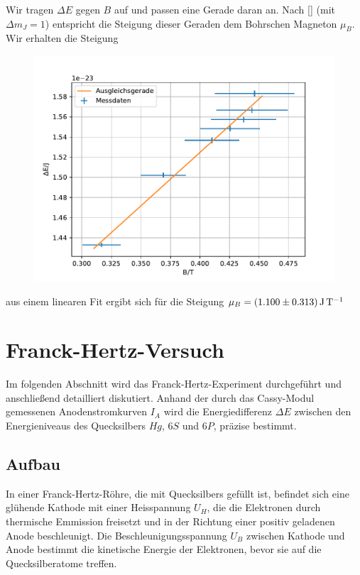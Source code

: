 \documentclass{article}
\begin{document}
\begin{multicols}{2}
Wir tragen $\Delta E$ gegen $B$ auf und passen eine Gerade daran an. Nach \eqref{} (mit $\Delta m_J=1$)
entspricht die Steigung dieser Geraden dem Bohrschen Magneton $\mu_B$. Wir erhalten die Steigung



\begin{figure}[H]
  \centering
  \includegraphics[width=\linewidth]{energy_plot.pdf}
\end{figure}
aus einem linearen Fit ergibt sich für die Steigung
$\mu_B = \SI{1.1\pm 0.313}{\J\per\T}$



\clearpage
\section{Franck-Hertz-Versuch}
Im folgenden Abschnitt wird das Franck-Hertz-Experiment durchgeführt und anschließend detailliert 
diskutiert. Anhand der durch das Cassy-Modul gemessenen Anodenstromkurven \( I_A \) wird die 
Energiedifferenz \( \Delta E \) zwischen den Energieniveaus des Quecksilbers $Hg$, \( 6S \) und \( 6P \), 
präzise bestimmt.
\subsection{Aufbau}
In einer Franck-Hertz-Röhre, die mit Quecksilbers gefüllt ist, befindet sich eine glühende 
Kathode mit einer Heisspannung $U_H$, die die Elektronen durch thermische Emmission freisetzt und in der 
Richtung einer positiv geladenen Anode beschleunigt. Die Beschleunigungsspannung $U_B$ zwischen Kathode 
und Anode bestimmt die kinetische Energie der Elektronen, bevor sie auf die Quecksilberatome treffen.


\end{multicols}
\end{document}
